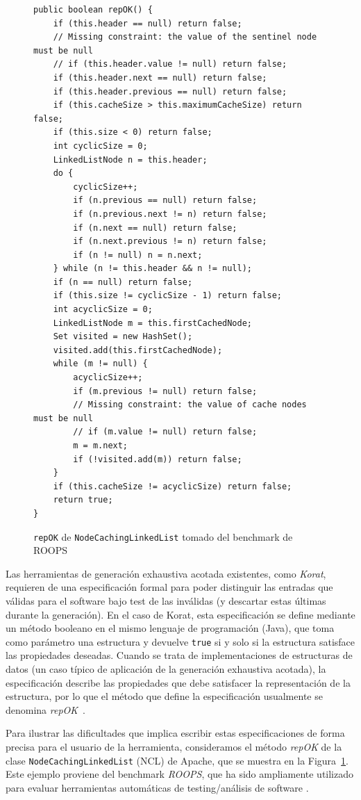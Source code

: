 \begin{figure}[!thb]
\begin{lstlisting}
public boolean repOK() {
    if (this.header == null) return false;
    // Missing constraint: the value of the sentinel node must be null  
    // if (this.header.value != null) return false;
    if (this.header.next == null) return false;
    if (this.header.previous == null) return false;
    if (this.cacheSize > this.maximumCacheSize) return false;
    if (this.size < 0) return false;
    int cyclicSize = 0;
    LinkedListNode n = this.header;
    do {
        cyclicSize++;
        if (n.previous == null) return false;
        if (n.previous.next != n) return false;
        if (n.next == null) return false;
        if (n.next.previous != n) return false;
        if (n != null) n = n.next;
    } while (n != this.header && n != null);
    if (n == null) return false;
    if (this.size != cyclicSize - 1) return false;
    int acyclicSize = 0;
    LinkedListNode m = this.firstCachedNode;
    Set visited = new HashSet();
    visited.add(this.firstCachedNode);
    while (m != null) {
        acyclicSize++;
        if (m.previous != null) return false;
        // Missing constraint: the value of cache nodes must be null
        // if (m.value != null) return false;
        m = m.next;
        if (!visited.add(m)) return false;
    }
    if (this.cacheSize != acyclicSize) return false;
    return true;
}
\end{lstlisting}
\caption{\texttt{repOK} de \texttt{NodeCachingLinkedList} tomado del benchmark de \textsf{ROOPS}}
\label{fig:NCL-repOK}
\end{figure}
Las herramientas de generación exhaustiva acotada existentes, como \emph{Korat},
requieren de una especificación formal para poder distinguir las entradas
que válidas para el software bajo test de las inválidas (y descartar estas
últimas durante la generación).
En el caso de Korat, esta especificación se define mediante 
un método booleano en el mismo lenguaje de programación (Java), que toma como
parámetro una estructura y devuelve
\texttt{true} si y solo si la estructura satisface las propiedades deseadas.
Cuando se trata de implementaciones de estructuras de datos (un caso típico de
aplicación de la generación exhaustiva acotada), la especificación describe las
propiedades que debe satisfacer la representación de la estructura, por lo que 
el método que define la especificación usualmente se denomina \emph{repOK}~\cite{Boyapati02}. 

Para ilustrar las dificultades que implica escribir estas especificaciones de
forma precisa para el usuario de la herramienta, consideramos el método 
\emph{repOK} de la clase \texttt{NodeCachingLinkedList} (NCL) de Apache, que se
muestra en la Figura~\ref{fig:NCL-repOK}. 
Este ejemplo proviene del benchmark \emph{ROOPS}, que ha sido ampliamente
utilizado para evaluar herramientas automáticas de testing/análisis de software 
\cite{} . 

